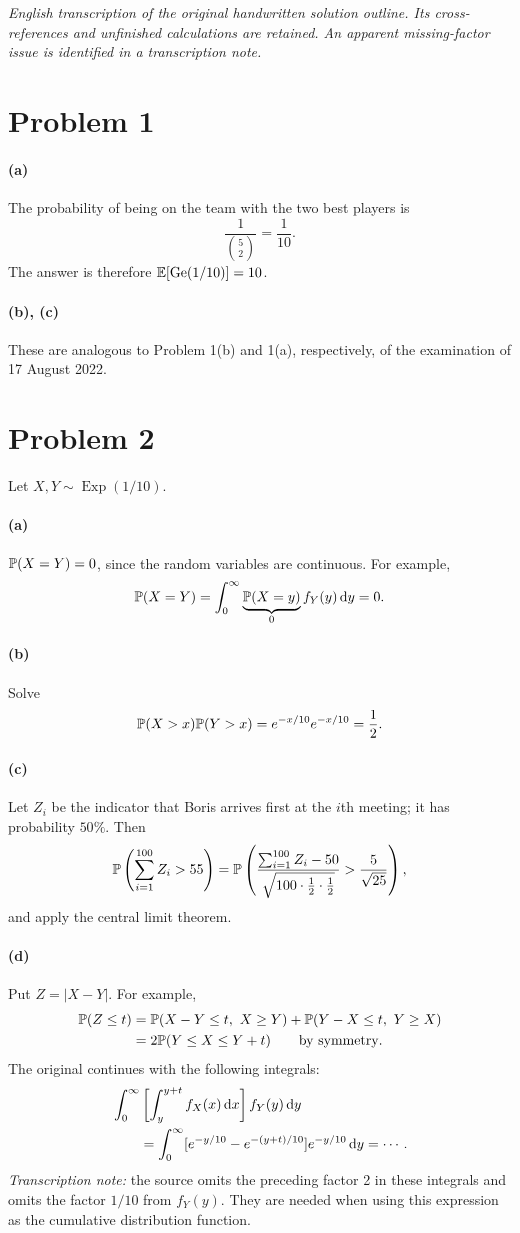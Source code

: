 \documentclass[11pt,a4paper]{article}
\begin{document}
\noindent\emph{English transcription of the original handwritten solution outline. Its cross-references and unfinished calculations are retained. An apparent missing-factor issue is identified in a transcription note.}

\section*{Problem 1}
\paragraph{(a)} The probability of being on the team with the two best players is
\[
\frac1{\binom52}=\frac1{10}.
\]
The answer is therefore $\E[\operatorname{Ge}(1/10)]=10$.
\paragraph{(b), (c)} These are analogous to Problem 1(b) and 1(a), respectively, of the examination of 17 August 2022.

\section*{Problem 2}
Let $X,Y\sim\operatorname{Exp}(1/10)$.
\paragraph{(a)} $\P(X=Y)=0$, since the random variables are continuous. For example,
\[
\P(X=Y)=\int_0^\infty\underbrace{\P(X=y)}_{0}f_Y(y)\d y=0.
\]
\paragraph{(b)} Solve
\[
\P(X>x)\P(Y>x)=e^{-x/10}e^{-x/10}=\frac12.
\]
\paragraph{(c)} Let $Z_i$ be the indicator that Boris arrives first at the $i$th meeting; it has probability $50\%$. Then
\[
\P\left(\sum_{i=1}^{100}Z_i>55\right)
=\P\left(\frac{\sum_{i=1}^{100}Z_i-50}{\sqrt{100\cdot\frac12\cdot\frac12}}
>\frac5{\sqrt{25}}\right),
\]
and apply the central limit theorem.
\paragraph{(d)} Put $Z=|X-Y|$. For example,
\begin{align*}
\P(Z\le t)&=\P(X-Y\le t,\ X\ge Y)+\P(Y-X\le t,\ Y\ge X)\\
&=2\P(Y\le X\le Y+t)\qquad\text{by symmetry}.
\end{align*}
The original continues with the following integrals:
\begin{align*}
&\int_0^\infty\left[\int_y^{y+t}f_X(x)\d x\right]f_Y(y)\d y\\
&\qquad=\int_0^\infty[e^{-y/10}-e^{-(y+t)/10}]e^{-y/10}\d y=\cdots.
\end{align*}
\emph{Transcription note:} the source omits the preceding factor 2 in these integrals and omits the factor $1/10$ from $f_Y(y)$. They are needed when using this expression as the cumulative distribution function.
\end{document}
